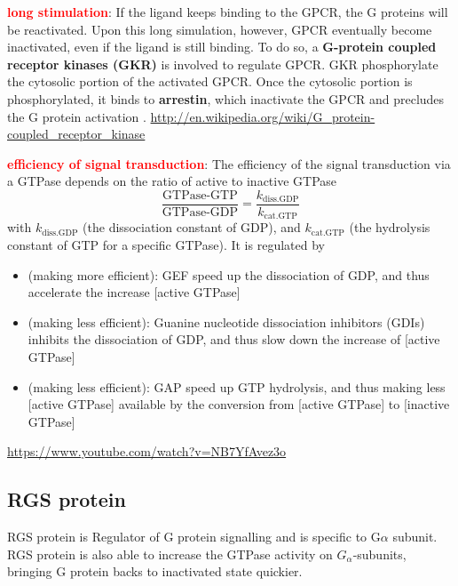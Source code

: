 \textcolor{red}{\bf long stimulation}: If the ligand keeps binding to the GPCR,
the G proteins will be reactivated.
Upon this long simulation, however, GPCR eventually become inactivated, even if
the ligand is still binding. To do so, a {\bf G-protein coupled receptor kinases
(GKR)} is involved to regulate GPCR. GKR phosphorylate the cytosolic portion of
the activated GPCR. Once the cytosolic portion is phosphorylated, it binds to
{\bf arrestin}, which inactivate the GPCR and precludes the G protein activation
\citep{Ribas2007}.
\url{http://en.wikipedia.org/wiki/G_protein-coupled_receptor_kinase}

\textcolor{red}{\bf efficiency of signal transduction}:
The efficiency of the signal transduction via a GTPase depends on the ratio of
active to inactive GTPase
\begin{equation}
\frac{\text{GTPase-GTP}}{\text{GTPase-GDP}} =
\frac{k_\text{diss.GDP}}{k_\text{cat.GTP}}
\end{equation}
with $k_\text{diss.GDP}$ (the dissociation constant of GDP), and
$k_\text{cat.GTP}$ (the hydrolysis constant of GTP for a specific GTPase).
It is regulated by
\begin{itemize}
  \item (making more efficient): GEF speed up the dissociation of GDP, and thus
  accelerate the increase [active GTPase]
  
  \item (making less efficient): Guanine nucleotide dissociation inhibitors
  (GDIs) inhibits the dissociation of GDP, and thus slow down the increase
  of [active GTPase]
  
  \item (making less efficient): GAP speed up GTP hydrolysis, and thus making
  less [active GTPase] available by the conversion from [active GTPase] to
  [inactive GTPase]
  
\end{itemize}

\url{https://www.youtube.com/watch?v=NB7YfAvez3o}

\subsection{RGS protein}
\label{sec:RGS_protein}

RGS protein is Regulator of G protein signalling and is specific to G$\alpha$
subunit. RGS protein is also able to increase the GTPase activity on
$G_\alpha$-subunits, bringing G protein backs to inactivated state quickier.

